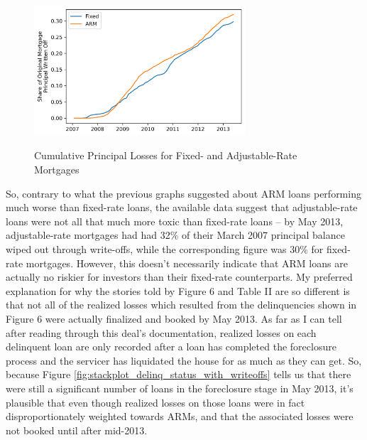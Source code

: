 \documentclass[12pt]{article}
\begin{document}
\begin{figure}[h]
	\centering
	\caption{Cumulative Principal Losses for Fixed- and Adjustable-Rate Mortgages}
	\includegraphics[width=0.7\textwidth]{../figures/timeseries_cumulative_losses_fixed_vs_arm}
	\label{fig:timeseries_cumulative_losses_fixed_vs_arm}
\end{figure}

So, contrary to what the previous graphs suggested about ARM loans performing much worse than fixed-rate loans, the available data suggest that adjustable-rate loans were not all that much more toxic than fixed-rate loans – by May 2013, adjustable-rate mortgages had had 32\% of their March 2007 principal balance wiped out through write-offs, while the corresponding figure was 30\% for fixed-rate mortgages. However, this doesn't necessarily indicate that ARM loans are actually no riskier for investors than their fixed-rate counterparts. My preferred explanation for why the stories told by Figure 6 and Table II are so different is that not all of the realized losses which resulted from the delinquencies shown in Figure 6 were actually finalized and booked by May 2013. As far as I can tell after reading through this deal’s documentation, realized losses on each delinquent loan are only recorded after a loan has completed the foreclosure process and the servicer has liquidated the house for as much as they can get. So, because Figure \ref{fig:stackplot_delinq_status_with_writeoffs} tells us that there were still a significant number of loans in the foreclosure stage in May 2013, it's plausible that even though realized losses on those loans were in fact disproportionately weighted towards ARMs, and that the associated losses were not booked until after mid-2013.
\end{document}
